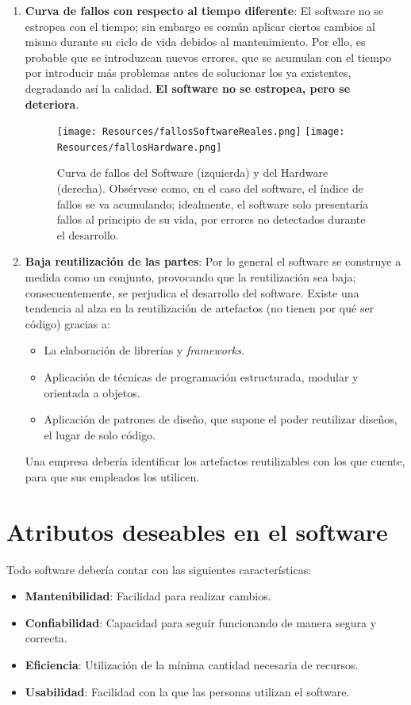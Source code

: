 \begin{enumerate}
    \item \textbf{Curva de fallos con respecto al tiempo diferente}:
          El software no se estropea con el tiempo; sin embargo es común aplicar ciertos cambios al mismo durante su ciclo de vida debidos al mantenimiento. Por ello, es probable que se introduzcan nuevos errores, que se acumulan con el tiempo por introducir más problemas antes de solucionar los ya existentes, degradando así la calidad. \textbf{El software no se estropea, pero se deteriora}.
          \begin{figure}[h]
            \centering
            \texttt{[image: Resources/fallosSoftwareReales.png]}
            \texttt{[image: Resources/fallosHardware.png]}
            \caption{Curva de fallos del Software (izquierda) y del Hardware (derecha). Obsérvese como, en el caso del software, el índice de fallos se va acumulando; idealmente, el software solo presentaría fallos al principio de su vida, por errores no detectados durante el desarrollo.}
        \end{figure}
    \item \textbf{Baja reutilización de las partes}:
          Por lo general el software se construye a medida como un conjunto, provocando que la reutilización sea baja; consecuentemente, se perjudica el desarrollo del software. Existe una tendencia al alza en la reutilización de artefactos (no tienen por qué ser código) gracias a:
          \begin{itemize}
              \item La elaboración de librerías y \textit{frameworks}.
              \item Aplicación de técnicas de programación estructurada, modular y orientada a objetos.
              \item Aplicación de patrones de diseño, que supone el poder reutilizar diseños, el lugar de solo código.
          \end{itemize}
          Una empresa debería identificar los artefactos reutilizables con los que cuente, para que sus empleados los utilicen.
\end{enumerate}

\section{Atributos deseables en el software}
Todo software debería contar con las siguientes características:
\begin{itemize}
    \item \textbf{Mantenibilidad}: Facilidad para realizar cambios.
    \item \textbf{Confiabilidad}: Capacidad para seguir funcionando de manera segura y correcta.
    \item \textbf{Eficiencia}: Utilización de la mínima cantidad necesaria de recursos.
    \item \textbf{Usabilidad}: Facilidad con la que las personas utilizan el software.
\end{itemize}

